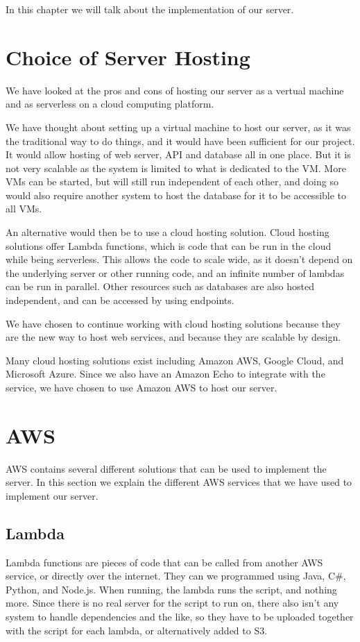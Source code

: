 In this chapter we will talk about the implementation of our server.

\section{Choice of Server Hosting}
We have looked at the pros and cons of hosting our server as a vertual machine and as serverless on a cloud computing platform.

We have thought about setting up a virtual machine to host our server, as it was the traditional way to do things, and it would have been sufficient for our project. It would allow hosting of web server, API and database all in one place. But it is not very scalable as the system is limited to what is dedicated to the VM. More VMs can be started, but will still run independent of each other, and doing so would also require another system to host the database for it to be accessible to all VMs.

An alternative would then be to use a cloud hosting solution. Cloud hosting solutions offer Lambda functions, which is code that can be run in the cloud while being serverless. This allows the code to scale wide, as it doesn't depend on the underlying server or other running code, and an infinite number of lambdas can be run in parallel. Other resources such as databases are also hosted independent, and can be accessed by using endpoints.

We have chosen to continue working with cloud hosting solutions because they are the new way to host web services, and because they are scalable by design.

Many cloud hosting solutions exist including Amazon AWS, Google Cloud, and Microsoft Azure. Since we also have an Amazon Echo to integrate with the service, we have chosen to use Amazon AWS to host our server.

\section{AWS}
AWS contains several different solutions that can be used to implement the server. In this section we explain the different AWS services that we have used to implement our server.

\subsection{Lambda}
Lambda functions are pieces of code that can be called from another AWS service, or directly over the internet. They can we programmed using Java, C\#, Python, and Node.js. When running, the lambda runs the script, and nothing more. Since there is no real server for the script to run on, there also isn't any system to handle dependencies and the like, so they have to be uploaded together with the script for each lambda, or alternatively added to S3.

